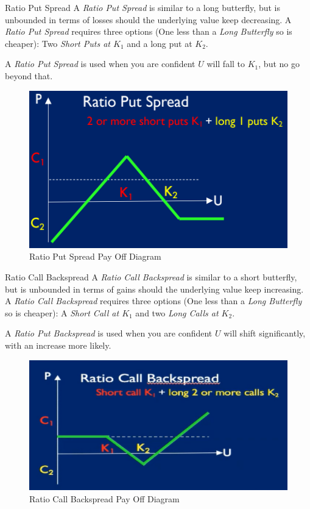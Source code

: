 \documentclass[11pt,a4paper]{article}
\begin{document}
\begin{definition}{Ratio Put Spread}
  A \textit{Ratio Put Spread} is similar to a long butterfly, but is unbounded in terms of losses should the underlying value keep decreasing. A \textit{Ratio Put Spread} requires three options (One less than a \textit{Long Butterfly} so is cheaper):  Two \textit{Short Puts at $K_1$} and a long put at $K_2$.
  \par A \textit{Ratio Put Spread} is used when you are confident $U$ will fall to $K_1$, but no go beyond that.
\end{definition}

\begin{figure}[ht!]
  \centering
  \includegraphics[width=.5\textwidth]{ratioPutSpread.PNG}
  \caption{Ratio Put Spread Pay Off Diagram}
\end{figure}

\begin{definition}{Ratio Call Backspread}
  A \textit{Ratio Call Backspread} is similar to a short butterfly, but is unbounded in terms of gains should the underlying value keep increasing. A \textit{Ratio Call Backspread} requires three options (One less than a \textit{Long Butterfly} so is cheaper):  A \textit{Short Call at $K_1$} and two \textit{Long Calls at $K_2$}.
  \par A \textit{Ratio Put Backspread} is used when you are confident $U$ will shift significantly, with an increase more likely.
\end{definition}

\begin{figure}[ht!]
  \centering
  \includegraphics[width=.5\textwidth]{ratioCallBackspread.PNG}
  \caption{Ratio Call Backspread Pay Off Diagram}
\end{figure}
\end{document}
